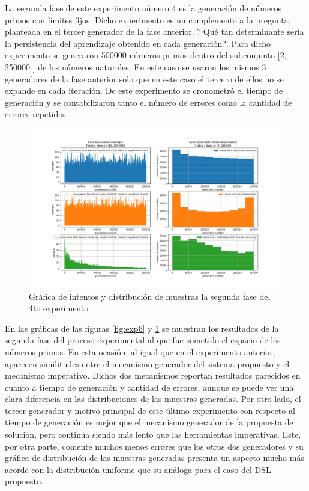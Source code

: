 La segunda fase de este experimento número 4 es la generación de números primos con límites fijos. Dicho experimento
es un complemento a la pregunta planteada en el tercer generador de la fase anterior. ?`Qué tan determinante sería
la persistencia del aprendizaje obtenido en cada generación?. Para dicho experimento se generaron 500000 números primos
dentro del subconjunto [2, 250000 ] de los números naturales. En este caso se usaron los mismos 3 generadores de la
fase anterior solo que en este caso el tercero de ellos no se expande en cada iteración. De este experimento se cronometró
el tiempo de generación y se contabilizaron tanto el número de errores como la cantidad de errores repetidos.

\begin{figure}[!ht]
      \includegraphics[width=\linewidth]{Graphics/exp7.png}
      \caption{Gráfica de intentos y distribución de muestras la segunda fase del 4to experimento}
      \label{fig:exp7}
\end{figure}

En las gráficas de las figuras \ref{fig:exp6} y \ref{fig:exp7} se muestran los resultados de la segunda 
fase del proceso experimental al que fue sometido el espacio de los números primos. En esta ocasión, al 
igual que en el experimento anterior, aparecen similitudes entre el mecanismo generador del sistema 
propuesto y el mecanismo imperativo. Dichos dos mecanismos reportan resultados parecidos en cuanto a 
tiempo de generación y cantidad de errores, aunque se puede ver una clara diferencia en las distribuciones 
de las muestras generadas. Por otro lado, el tercer generador y motivo principal de este último experimento 
con respecto al tiempo de generación es mejor que el mecanismo generador de la propuesta de solución, pero 
continúa siendo más lento que las herramientas imperativas. Este, por otra parte, comente muchos menos errores 
que los otros dos generadores y su gráfica de distribución de las muestras generadas presenta un aspecto mucho 
más acorde con la distribución uniforme que su análoga para el caso del DSL propuesto.

